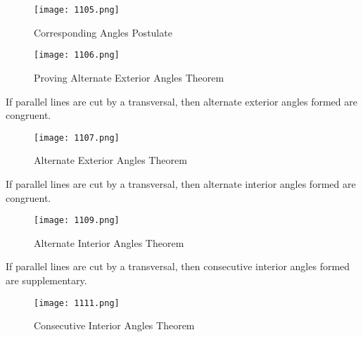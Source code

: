 \begin{figure}[htb!]
  \centering
  \texttt{[image: 1105.png]}
  \caption{Corresponding Angles Postulate}
\end{figure}

\begin{figure}[htb!]
  \centering
  \texttt{[image: 1106.png]}
  \caption{Proving Alternate Exterior Angles Theorem}
\end{figure}

\newpage

\begin{tcolorbox}[colback=Red!5!white,colframe=Red!75!black,title=Alternate Exterior Angles Theorem]
  If parallel lines are cut by a transversal, then alternate exterior angles formed are congruent.
\end{tcolorbox}

\begin{figure}[htb!]
  \centering
  \texttt{[image: 1107.png]}
  \caption{Alternate Exterior Angles Theorem}
\end{figure}

\vspace{.4cm}

\begin{tcolorbox}[colback=Red!5!white,colframe=Red!75!black,title=Alternate Interior Angles Theorem]
  If parallel lines are cut by a transversal, then alternate interior angles formed are congruent.
\end{tcolorbox}

\begin{figure}[htb!]
  \centering
  \texttt{[image: 1109.png]}
  \caption{Alternate Interior Angles Theorem}
\end{figure}

\newpage

\begin{tcolorbox}[colback=Red!5!white,colframe=Red!75!black,title=Consecutive Interior Angles Theorem]
  If parallel lines are cut by a transversal, then consecutive interior angles formed are supplementary.
\end{tcolorbox}

\begin{figure}[htb!]
  \centering
  \texttt{[image: 1111.png]}
  \caption{Consecutive Interior Angles Theorem}
\end{figure}

\vspace{.5cm}


